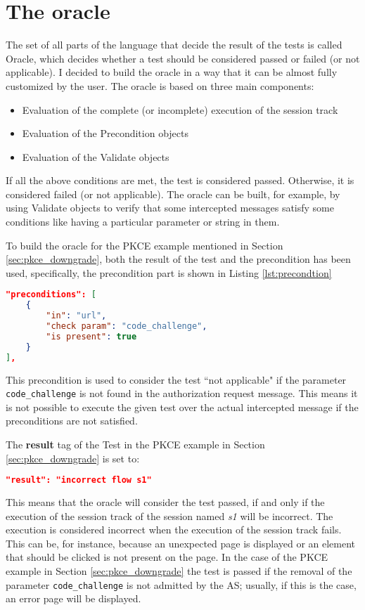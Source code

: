 \section{The oracle}
The set of all parts of the language that decide the result of the tests is called Oracle,
which decides whether a test should be considered passed or failed (or not applicable). I decided to build the oracle in a way that it can be almost fully customized by the user. 
The oracle is based on three main components:
\begin{itemize}
    \item Evaluation of the complete (or incomplete) execution of the \gls{session track} 
    \item Evaluation of the Precondition objects
    \item Evaluation of the Validate objects
\end{itemize}
If all the above conditions are met, the test is considered passed. Otherwise, it is considered failed (or not applicable).
The oracle can be built, for example, by using Validate objects to verify that some intercepted messages satisfy some conditions like having a particular parameter or string in them.

To build the oracle for the \gls{PKCE} example mentioned in Section \ref{sec:pkce_downgrade}, both the result of the test and the precondition has been used, specifically, the precondition part is shown in Listing \ref{lst:precondtion}
\begin{lstlisting}[language=json, caption=Precondition definition, label={lst:precondtion}]
"preconditions": [
    {
        "in": "url",
        "check param": "code_challenge",
        "is present": true
    }
],
\end{lstlisting}
This precondition is used to consider the test ``not applicable" if the parameter \texttt{code\_challenge} is not found in the authorization request message. This means it is not possible to execute the given test over the actual intercepted message if the preconditions are not satisfied.

The \textbf{result} tag of the Test in the \gls{PKCE} example in Section \ref{sec:pkce_downgrade} is set to:
\begin{lstlisting}[language=json]
"result": "incorrect flow s1"
\end{lstlisting}
This means that the oracle will consider the test passed, if and only if the execution of the \gls{session track} of the session named \textit{s1} will be incorrect. The execution is considered incorrect when the execution of the \gls{session track} fails. This can be, for instance, because an unexpected page is displayed or an element that should be clicked is not present on the page. In the case of the PKCE example in Section \ref{sec:pkce_downgrade} the test is passed if the removal of the parameter \texttt{code\_challenge} is not admitted by the AS; usually, if this is the case, an error page will be displayed.

